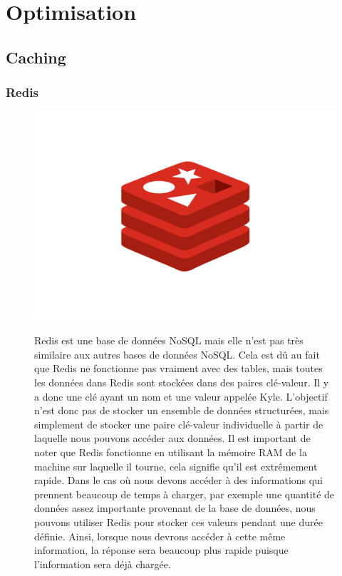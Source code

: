\section{Optimisation}
\subsection{Caching}
\subsubsection{Redis}
\begin{figure}[H]
    \begin{minipage}{.3\textwidth}
      \includegraphics[width=1\linewidth]{img/redis.png}
    \end{minipage}
    \begin{minipage}{.7\textwidth}
Redis est une base de données NoSQL mais elle n'est pas très similaire aux autres bases de données NoSQL. Cela est dû au fait que Redis ne fonctionne pas vraiment avec des tables, mais toutes les données dans Redis sont stockées dans des paires clé-valeur. 
Il y a donc une clé ayant un nom et une valeur appelée Kyle.
L'objectif n'est donc pas de stocker un ensemble de données structurées, mais simplement de stocker une paire clé-valeur individuelle à partir de laquelle nous pouvons accéder aux données.
Il est important de noter que Redis fonctionne en utilisant la mémoire RAM de la machine sur laquelle il tourne, cela signifie qu'il est extrêmement rapide.
\newpara
Dans le cas où nous devons accéder à des informations qui prennent beaucoup de temps à charger, par exemple une quantité de données assez importante provenant de la base de données, nous pouvons utiliser Redis pour stocker ces valeurs pendant une durée définie. Ainsi, lorsque nous devrons accéder à cette même information, la réponse sera beaucoup plus rapide puisque l'information sera déjà chargée.
\end{minipage}
\end{figure}
